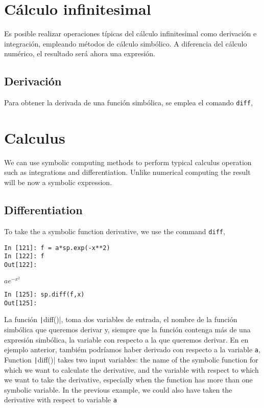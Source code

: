 \begin{paracol}{2}
\section{Cálculo infinitesimal}
Es posible realizar operaciones típicas del cálculo infinitesimal como derivación e integración, empleando métodos de cálculo simbólico. A diferencia del cálculo numérico, el resultado será ahora una expresión.
\subsection{Derivación}
Para obtener la derivada de una función simbólica, se emplea el comando \texttt{diff},
\switchcolumn
\section{Calculus}
We can use symbolic computing methods to perform typical calculus operation such as integrations and differentiation. Unlike numerical computing the result will be now a symbolic expression.  
\subsection{Differentiation}
To take the  a symbolic function derivative, we use the command \texttt{diff},
\end{paracol}

\begin{center}
	\begin{minipage}{.5\textwidth}
		\begin{verbatim}
In [121]: f = a*sp.exp(-x**2)
In [122]: f
Out[122]:
		\end{verbatim}
$ae^{-x^2}$
		\begin{verbatim}
In [125]: sp.diff(f,x)
Out[125]: 
\end{verbatim}
	\end{minipage}
\end{center}

\begin{paracol}{2}
La función \texttt|diff()|, toma dos variables de entrada, el nombre de la función simbólica que queremos derivar y, siempre que la función contenga más de una expresión simbólica, la variable con respecto a la que queremos derivar. En en ejemplo anterior, tambiém podríamos haber derivado con respecto a la variable \texttt{a},
\switchcolumn
Function \texttt|diff()| takes two input variables: the name of the symbolic function for which we want to calculate the derivative, and the variable with respect to which we want to take the derivative, especially when the function has more than one symbolic variable. In the previous example, we could also have taken the derivative with respect to variable \texttt{a} 
\end{paracol}

